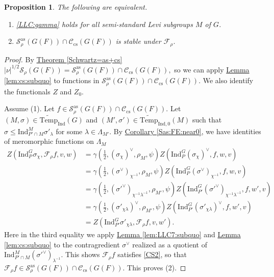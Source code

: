 \documentclass[10pt]{amsart}
\newtheorem{proposition}[theorem]{Proposition}
\theoremstyle{definition}
\numberwithin{equation}{section}
\numberwithin{equation}{subsection}
\newcommand{\Ind}{\mathrm{Ind}}
\newcommand{\Temp}{\mathrm{Temp}}
\begin{document}
\begin{proposition}\label{LLC7=Fourierstable}
The following are equivalent.
\begin{enumerate}
    \item \eqref{LLC:gamma} holds for all semi-standard Levi subgroups $M$ of $G$.
    \item $\mathcal{S}^{\mathrm{as}}_{\rho}(G(F))\cap \mathcal{C}_{\mathrm{cs}}(G(F))$ is stable under $\mathcal{F}_\rho$.
\end{enumerate}
\end{proposition}
\begin{proof} By \hyperref[Schwartz=as+cs]{Theorem \ref{Schwartz=as+cs}} $|\nu|^{1/2}\mathcal{S}_\rho(G(F))=\mathcal{S}^{\mathrm{as}}_{\rho}(G(F))\cap \mathcal{C}_{\mathrm{cs}}(G(F)),$ so we can apply \hyperref[lem:cs:subquo]{Lemma \ref{lem:cs:subquo}} to functions in $\mathcal{S}^{\mathrm{as}}_{\rho}(G(F))\cap \mathcal{C}_{\mathrm{cs}}(G(F))$. We also identify the functionals $Z$ and $Z_0$.

Assume (1). Let $f\in \mathcal{S}^{\mathrm{as}}_{\rho}(G(F))\cap \mathcal{C}_{\mathrm{cs}}(G(F)).$ Let $(M,\sigma)\in\widetilde{\Temp}_\Ind(G)$ and $(M',\sigma')\in\widetilde{\Temp}_{\Ind,0}(M)$ such that $\sigma\le \mathrm{Ind}_{P'\cap M}^{M} \sigma'_{\lambda}$ for some $\lambda\in \Lambda_{M'}$. By \hyperref[Sas:FE:near0]{Corollary \ref{Sas:FE:near0}}, we have identities of meromorphic functions on $\Lambda_M$
\begin{align*}
    Z(\mathrm{Ind}_P^G \sigma_\chi, \mathcal{F}_\rho f,v,w) &= \gamma(\tfrac{1}{2},(\sigma_\chi)^\vee,\rho_M,\psi)Z(\mathrm{Ind}_P^G (\sigma_\chi)^\vee, f,w,v)\\
    &= \gamma(\tfrac{1}{2},(\sigma^\vee)_{\chi^{-1}},\rho_M,\psi)Z(\mathrm{Ind}_P^G (\sigma^\vee)_{\chi^{-1}}, f,w,v)\\
    &=\gamma(\tfrac{1}{2},(\sigma'^\vee)_{\chi^{-1}\lambda^{-1}},\rho_{M'},\psi)Z(\mathrm{Ind}_{P'}^G (\sigma'^\vee)_{\chi^{-1}\lambda^{-1}}, f,w',v)\\
    &=\gamma(\tfrac{1}{2},(\sigma'_{\chi\lambda})^\vee,\rho_{M'},\psi)Z(\mathrm{Ind}_{P'}^G (\sigma'_{\chi\lambda})^\vee, f,w',v)\\
    &= Z(\Ind_{P'}^G\sigma'_{\chi\lambda},\mathcal{F}_\rho f,v,w').
\end{align*}
Here in the third equality we apply \hyperref[lem:LLC7:subquo]{Lemma \ref{lem:LLC7:subquo}} and \hyperref[lem:cs:subquo]{Lemma \ref{lem:cs:subquo}} to the contragredient $\sigma^\vee$ realized as a quotient of $\Ind_{P'\cap M}^M(\sigma'^\vee)_{\lambda^{-1}}$. This shows $\mathcal{F}_\rho f$ satisfies \eqref{CS2}, so that $\mathcal{F}_\rho f\in \mathcal{S}^{\mathrm{as}}_{\rho}(G(F))\cap \mathcal{C}_{\mathrm{cs}}(G(F))$. This proves (2).


\end{proof}
\end{document}

